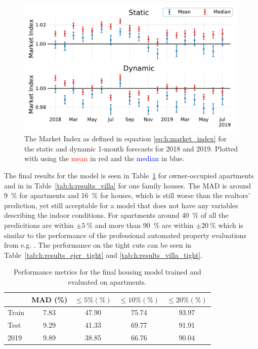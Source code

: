 \begin{figure}
  \centerfloat
  \includegraphics[width=0.99\textwidth, trim=10 15 10 10, clip]{figures/housing/Ejerlejlighed_v19_cut_all_Ncols_all_xgb_forecast_prediction_MarketIndex.pdf}
  \caption[Market Index based on the Static and Dynamic XGB Forecasts]
          {The Market Index as defined in equation \eqref{eq:h:market_index} for the static and dynamic 1-month forecasts for \num{2018} and \num{2019}. Plotted with using the \textcolor{red}{mean} in red and the \textcolor{blue}{median} in blue.} 
  \label{fig:h:forecast_MarketIndex}
\end{figure}

The final results for the model is seen in Table~\ref{tab:h:results_ejer} for owner-occupied apartments and in in Table~\ref{tab:h:results_villa} for one family houses. The MAD is around \SI{9}{\percent} for apartments and \SI{16}{\percent} for houses, which is still worse than the realtors' prediction, yet still acceptable for a model that does not have any variables describing the indoor conditions. For apartments around \SI{40}{\percent} of all the predicitions are within $\pm \SI{5}{\percent}$ and more than \SI{90}{\percent} are within $\pm \SI{20}{\percent}$ which is similar to the performance of the professional automated property evaluations from e.g. \citet{bolighedBolighedUsikkerhedDatavurderingen}. The performance on the tight cuts can be seen in Table~\ref{tab:h:results_ejer_tight} and \ref{tab:h:results_villa_tight}. 


\begin{table}
  \centerfloat
  \begin{tabular}{@{}lcccc@{}}
    {} &      MAD (\%) & $\leq 5\% (\%)$ &  $\leq 10\% (\%)$ &   $\leq 20\% (\%)$   \\
    \midrule
    Train & \num{7.83} & \num{47.90} & \num{75.74} & \num{93.97} \\
    Test  & \num{9.29} & \num{41.33} & \num{69.77} & \num{91.91} \\
    2019  & \num{9.89} & \num{38.85} & \num{66.76} & \num{90.04}    
  \end{tabular}
  \vspace{\abovecaptionskip}
  \caption[Performance Metrics for the Housing Model on Apartments]{Performance metrics for the final housing model trained and evaluated on apartments.}
  \label{tab:h:results_ejer}
\end{table}


